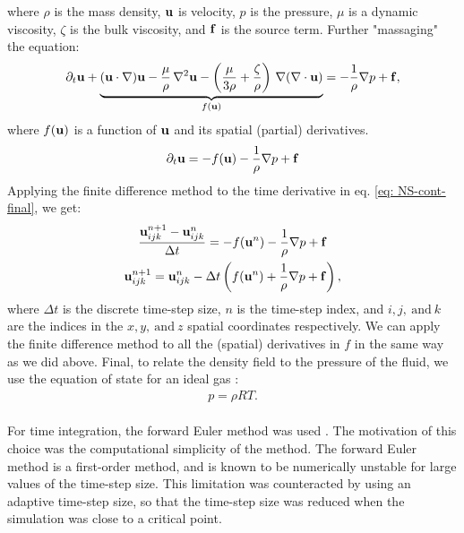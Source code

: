 where $\rho$ is the mass density, $\mathbf{u}$ is velocity, $p$ is the pressure, $\mu$ is a dynamic viscosity, $\zeta$ is the bulk viscosity, and $\mathbf{f}$ is the source term.
Further "massaging" the equation:
\begin{gather}
    \partial_t \mathbf{u} + \underbrace{(\mathbf {u} \cdot \nabla) \mathbf{u} -\frac{\mu}{\rho} \,\nabla ^{2}\mathbf{u}-\left(\frac{\mu}{3\rho} +\frac{\zeta}{\rho} \right)\,\nabla (\nabla \cdot \mathbf{u})}_{f\left(\mathbf{u}\right)} =-{\frac {1}{\rho }}\nabla p + \mathbf{f} ,
\end{gather}
where $f(\mathbf{u})$ is a function of $\mathbf{u}$ and its spatial (partial) derivatives.
\begin{gather}
    \partial_t \mathbf{u}  = -f(\mathbf{u}) -{\frac {1}{\rho }}\nabla p +\mathbf{f} \label{eq: NS-cont-final}
\end{gather}
Applying the finite difference method \cite{landau2015computational}
to the time derivative in eq. \ref{eq: NS-cont-final}, we get:
\begin{gather}
    \frac{\mathbf{u}_{ijk}^{n+1} - \mathbf{u}_{ijk}^n}{\Delta t} = -f(\mathbf{u}^n) -{\frac {1}{\rho }}\nabla p+\mathbf{f} \\
    \mathbf{u}_{ijk}^{n+1} = \mathbf{u}_{ijk}^n - \Delta t \left(f(\mathbf{u}^n) + {\frac {1}{\rho }}\nabla p + \mathbf{f}\right), \label{eq: NS-fd}
\end{gather}
where $\Delta t$ is the discrete time-step size, $n$ is the time-step index, and $i,j,~\text{and}~k$ are the indices in the $x,y,~\text{and}~z$ spatial coordinates respectively. We can apply the finite difference method to all the (spatial) derivatives in $f$ in the same way as we did above. Final, to relate the density field to the pressure of the fluid, we use the equation of state for an ideal gas \cite{thermalBook}: 
\begin{gather}
    p = \rho R T.
\end{gather}
\\

For time integration, the forward Euler method
was used \cite{landau2015computational}. The motivation of this choice was the computational simplicity of the method. The forward Euler method is a first-order method, and is known to be numerically unstable \cite{landau2015computational}
for large values of the time-step size. This limitation was counteracted by using an adaptive time-step size, so that the time-step size was reduced when the simulation was close to a critical point. \\

